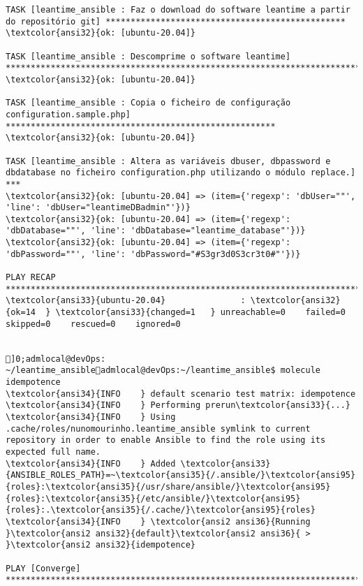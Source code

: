 \documentclass{scrartcl}
\begin{document}
\begin{Verbatim}
TASK [leantime_ansible : Faz o download do software leantime a partir do repositório git] ************************************************
\textcolor{ansi32}{ok: [ubuntu-20.04]}

TASK [leantime_ansible : Descomprime o software leantime] ********************************************************************************
\textcolor{ansi32}{ok: [ubuntu-20.04]}

TASK [leantime_ansible : Copia o ficheiro de configuração configuration.sample.php] ******************************************************
\textcolor{ansi32}{ok: [ubuntu-20.04]}

TASK [leantime_ansible : Altera as variáveis dbuser, dbpassword e dbdatabase no ficheiro configuration.php utilizando o módulo replace.] ***
\textcolor{ansi32}{ok: [ubuntu-20.04] => (item={'regexp': 'dbUser=""', 'line': 'dbUser="leantimeDBadmin"'})}
\textcolor{ansi32}{ok: [ubuntu-20.04] => (item={'regexp': 'dbDatabase=""', 'line': 'dbDatabase="leantime_database"'})}
\textcolor{ansi32}{ok: [ubuntu-20.04] => (item={'regexp': 'dbPassword=""', 'line': 'dbPassword="#S3gr3d0S3cr3t0#"'})}

PLAY RECAP *******************************************************************************************************************************
\textcolor{ansi33}{ubuntu-20.04}               : \textcolor{ansi32}{ok=14  } \textcolor{ansi33}{changed=1   } unreachable=0    failed=0    skipped=0    rescued=0    ignored=0


]0;admlocal@devOps: ~/leantime_ansibleadmlocal@devOps:~/leantime_ansible$ molecule idempotence
\textcolor{ansi34}{INFO    } default scenario test matrix: idempotence
\textcolor{ansi34}{INFO    } Performing prerun\textcolor{ansi33}{...}
\textcolor{ansi34}{INFO    } Using .cache/roles/nunomourinho.leantime_ansible symlink to current repository in order to enable Ansible to find the role using its expected full name.
\textcolor{ansi34}{INFO    } Added \textcolor{ansi33}{ANSIBLE_ROLES_PATH}=~\textcolor{ansi35}{/.ansible/}\textcolor{ansi95}{roles}:\textcolor{ansi35}{/usr/share/ansible/}\textcolor{ansi95}{roles}:\textcolor{ansi35}{/etc/ansible/}\textcolor{ansi95}{roles}:.\textcolor{ansi35}{/.cache/}\textcolor{ansi95}{roles}
\textcolor{ansi34}{INFO    } \textcolor{ansi2 ansi36}{Running }\textcolor{ansi2 ansi32}{default}\textcolor{ansi2 ansi36}{ > }\textcolor{ansi2 ansi32}{idempotence}

PLAY [Converge] **************************************************************************************************************************


\end{Verbatim}
\end{document}
